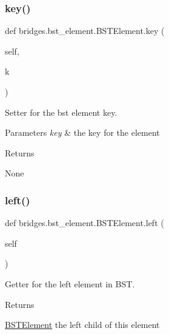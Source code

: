 \subsubsection{\texorpdfstring{key()}{key()}\hspace{0.1cm}{\footnotesize\ttfamily [2/2]}}
{\footnotesize\ttfamily def bridges.\+bst\+\_\+element.\+B\+S\+T\+Element.\+key (\begin{DoxyParamCaption}\item[{}]{self,  }\item[{}]{k }\end{DoxyParamCaption})}



Setter for the bst element key. 


\begin{DoxyParams}{Parameters}
{\em key} & the key for the element \\
\hline
\end{DoxyParams}
\begin{DoxyReturn}{Returns}


None 
\end{DoxyReturn}
\mbox{\label{classbridges_1_1bst__element_1_1_b_s_t_element_adb40ae0f98fe1cb7f153494c544d3f9f}} 
\subsubsection{\texorpdfstring{left()}{left()}\hspace{0.1cm}{\footnotesize\ttfamily [1/2]}}
{\footnotesize\ttfamily def bridges.\+bst\+\_\+element.\+B\+S\+T\+Element.\+left (\begin{DoxyParamCaption}\item[{}]{self }\end{DoxyParamCaption})}



Getter for the left element in B\+ST. 

\begin{DoxyReturn}{Returns}


\mbox{\hyperlink{classbridges_1_1bst__element_1_1_b_s_t_element}{B\+S\+T\+Element}} the left child of this element 
\end{DoxyReturn}
\mbox{\label{classbridges_1_1bst__element_1_1_b_s_t_element_a0b45e63b73faabb6b969dd6222e07942}} 
